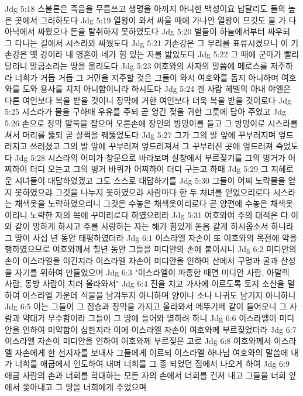 Jdg 5:18  스불론은 죽음을 무릅쓰고 생명을 아끼지 아니한 백성이요 납달리도 들의 높은 곳에서 그러하도다
Jdg 5:19  열왕이 와서 싸울 때에 가나안 열왕이 므깃도 물 가 다아낙에서 싸웠으나 돈을 탈취하지 못하였도다
Jdg 5:20  별들이 하늘에서부터 싸우되 그 다니는 길에서 시스라와 싸웠도다
Jdg 5:21  기손강은 그 무리를 표류시켰으니 이 기손강은 옛 강이라 내 영혼아 네가 힘 있는 자를 밟았도다
Jdg 5:22  그 때에 군마가 빨리 달리니 말굽소리는 땅을 울리도다
Jdg 5:23  여호와의 사자의 말씀에 메로스를 저주하라 너희가 거듭 거듭 그 거민을 저주할 것은 그들이 와서 여호와를 돕지 아니하며 여호와를 도와 용사를 치지 아니함이니라 하시도다
Jdg 5:24  겐 사람 헤벨의 아내 야엘은 다른 여인보다 복을 받을 것이니 장막에 거한 여인보다 더욱 복을 받을 것이로다
Jdg 5:25  시스라가 물을 구하매 우유를 주되 곧 엉긴 젖을 귀한 그릇에 담아 주었고
Jdg 5:26  손으로 장막 말뚝을 잡으며 오른손에 장인의 방망이를 들고 그 방망이로 시스라를 쳐서 머리를 뚫되 곧 살쩍을 꿰뚫었도다
Jdg 5:27  그가 그의 발 앞에 꾸부러지며 엎드러지고 쓰러졌고 그의 발 앞에 꾸부러져 엎드러져서 그 꾸부러진 곳에 엎드러져 죽었도다
Jdg 5:28  시스라의 어미가 창문으로 바라보며 살창에서 부르짖기를 그의 병거가 어찌하여 더디 오는고 그의 병거 바퀴가 어찌하여 더디 구는고 하매
Jdg 5:29  그 지혜로운 시녀들이 대답하였겠고 그도 스스로 대답하기를
Jdg 5:30  그들이 어찌 노략물을 얻지 못하였으랴 그것을 나누지 못하였으랴 사람마다 한 두 처녀를 얻었으리로다 시스라는 채색옷을 노략하였으리니 그것은 수놓은 채색옷이리로다 곧 양편에 수놓은 채색옷이리니 노략한 자의 목에 꾸미리로다 하였으리라
Jdg 5:31  여호와여 주의 대적은 다 이와 같이 망하게 하시고 주를 사랑하는 자는 해가 힘있게 돋음 같게 하시옵소서 하니라 그 땅이 사십 년 동안 태평하였더라
Jdg 6:1  이스라엘 자손이 또 여호와의 목전에 악을 행하였으므로 여호와께서 칠년 동안 그들을 미디안의 손에 붙이시니
Jdg 6:2  미디안의 손이 이스라엘을 이긴지라 이스라엘 자손이 미디안을 인하여 산에서 구멍과 굴과 산성을 자기를 위하여 만들었으며
Jdg 6:3  "이스라엘이 파종한 때면 미디안 사람, 아말렉 사람, 동방 사람이 치러 올라와서"
Jdg 6:4  진을 치고 가사에 이르도록 토지 소산을 멸하여 이스라엘 가운데 식물을 남겨두지 아니하며 양이나 소나 나귀도 남기지 아니하니
Jdg 6:5  이는 그들이 그 짐승과 장막을 가지고 올라와서 메뚜기떼 같이 들어오니 그 사람과 약대가 무수함이라 그들이 그 땅에 들어와 멸하려 하니
Jdg 6:6  이스라엘이 미디안을 인하여 미약함이 심한지라 이에 이스라엘 자손이 여호와께 부르짖었더라
Jdg 6:7  이스라엘 자손이 미디안을 인하여 여호와께 부르짖은 고로
Jdg 6:8  여호와께서 이스라엘 자손에게 한 선지자를 보내사 그들에게 이르되 이스라엘 하나님 여호와의 말씀에 내가 너희를 애굽에서 인도하여 내며 너희를 그 종 되었던 집에서 나오게 하여
Jdg 6:9  애굽 사람의 손과 너희를 학대하는 모든 자의 손에서 너희를 건져 내고 그들을 너희 앞에서 쫓아내고 그 땅을 너희에게 주었으며

